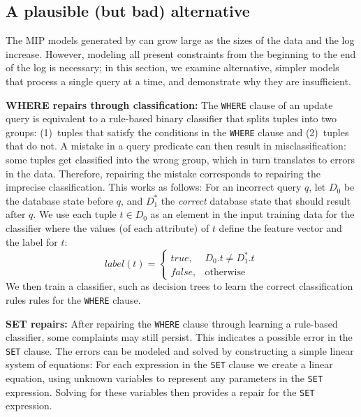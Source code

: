 
\subsection{A plausible (but bad) alternative}
\label{sec:heuristic}


The MIP models generated by \sys can grow large as the sizes of the
data and the log increase. However, modeling all present constraints
from the beginning to the end of the log is necessary; in this
section, we examine alternative, simpler models that process a single
query at a time, and demonstrate why they are insufficient.

\smallskip
\noindent
\textbf{WHERE repairs through classification:}
The \texttt{WHERE} clause of an update query is equivalent to a
rule-based binary classifier that splits tuples into two groups:
(1)~tuples that satisfy the conditions in the \texttt{WHERE} clause
and (2)~tuples that do not. A mistake in a query predicate can then
result in misclassification: some tuples get classified into the wrong
group, which in turn translates to errors in the data. Therefore,
repairing the mistake corresponds to repairing the imprecise
classification. This works as follows: For an incorrect query $q$, let
$D_0$ be the database state before $q$, and $D_1^*$ the \emph{correct}
database state that should result after $q$.
We use each tuple $t \in D_0$ as an element in the input training data
for the classifier where the values (of each attribute) of $t$ define
the feature vector and the label for $t$:
	\[
    label(t)= 
    \begin{cases}
    true ,& D_0.t \neq D_1^*.t\\
    false,              & \text{otherwise}
    \end{cases}
\]
We then train a classifier, such as decision trees \cite{???} to learn
the correct classification rules rules for the \texttt{WHERE} clause.


\smallskip
\noindent
\textbf{SET repairs:}
After repairing the \texttt{WHERE} clause through learning a
rule-based classifier, some complaints may still persist. This
indicates a possible error in the \texttt{SET} clause. The errors can
be modeled and solved by constructing a simple linear system of
equations: For each expression in the \texttt{SET} clause we create a
linear equation, using unknown variables to represent any parameters
in the \texttt{SET} expression. Solving for these variables then
provides a repair for the \texttt{SET} expression.


